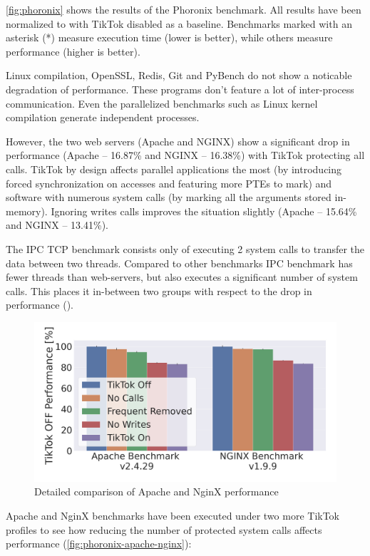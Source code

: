\documentclass[conference]{IEEEtran}
\newcommand{\sysname}{TikTok}
\begin{document}
\autoref{fig:phoronix} shows the results of the Phoronix benchmark. All
results have been normalized to with \sysname{} disabled as a baseline. Benchmarks
marked with an asterisk (*) measure execution time (lower is better), while others
measure performance (higher is better).

Linux compilation, OpenSSL, Redis, Git and PyBench do not show a noticable
degradation of performance. These programs don't feature a lot of inter-process
communication. Even the parallelized benchmarks such as Linux kernel compilation
generate independent processes.

However, the two web servers (Apache and NGINX) show a significant drop in
performance (Apache -- 16.87\% and NGINX -- 16.38\%) with \sysname{} protecting all calls. \sysname
by design affects parallel applications the most (by introducing forced
synchronization on accesses and featuring more PTEs to mark) and software with
numerous system calls (by marking all the arguments stored in-memory). Ignoring
writes calls improves the situation slightly (Apache -- 15.64\% and NGINX -- 13.41\%).

The IPC TCP benchmark consists only of executing 2 system calls to transfer
the data between two threads. Compared to other benchmarks IPC benchmark has fewer
threads than web-servers, but also executes a significant number of system calls.
This places it in-between two groups with respect to the drop in performance ().

\begin{figure}[]
  \centering
  \includegraphics[width=\linewidth]{graphs/apache-nginx-5.png}
  \caption{Detailed comparison of Apache and NginX performance}
  \label{fig:phoronix-apache-nginx}
\end{figure}

Apache and NginX benchmarks have been executed under two more \sysname{} profiles to 
see how reducing the number of protected system calls affects performance (\autoref{fig:phoronix-apache-nginx}):
\end{document}
